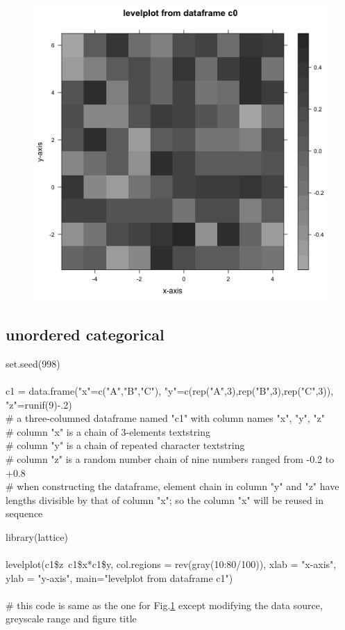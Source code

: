 \documentclass[../note.tex]{subfiles} %
\begin{document}
\begin{figure}[H]
    \centering
    \includegraphics[width=.5\linewidth]{graph/lvPlt1.png}
    \label{g:lv1}
\end{figure}

\subsection{unordered categorical}
\begin{code}
set.seed(998)\\\\
c1 = data.frame("x"=c("A","B","C"), "y"=c(rep("A",3),rep("B",3),rep("C",3)), "z"=runif(9)-.2)\\
\# a three-columned dataframe named "c1" with column names "x", "y", "z"\\
\# column "x" is a chain of 3-elements textstring\\
\# column "y" is a chain of repeated character textstring\\
\# column "z" is a random number chain of nine numbers ranged from -0.2 to +0.8\\
\# when constructing the dataframe, element chain in column "y" and "z" have lengths divisible by that of column "x"; so the column "x" will be reused in sequence
\end{code}

\begin{code}
library(lattice)\\\\
levelplot(c1\$z~c1\$x*c1\$y, col.regions = rev(gray(10:80/100)), xlab = "x-axis", ylab = "y-axis", main="levelplot from dataframe c1")\\\\
\# this code is same as the one for Fig.\ref{g:lv1} except modifying the data source, greyscale range and figure title
\end{code}
\end{document}
